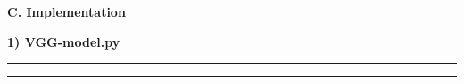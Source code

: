 \documentclass[a4paper]{article}
\newcommand{\HRule}{\rule{\linewidth}{0.5mm}}
\begin{document}
\vspace{5mm}
\begin{center}
\large\textbf{C. Implementation} \\
\end{center}

\vspace{5mm}

\noindent \normalsize \textbf{1) VGG-model.py} \small

\noindent \HRule



\noindent \HRule

\vspace{1.5cm}



% 





%  


\end{document}
